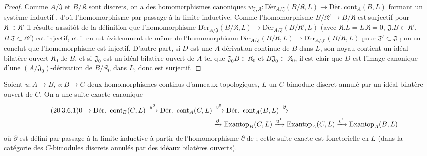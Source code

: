 \begin{proof}
Comme $A/\mathfrak{J}$ et $B/\mathfrak{K}$ sont discrets, on a des
homomorphismes canoniques
$w_{\mathfrak{J},\mathfrak{K}}:
\operatorname{D\acute{e}r}_{A/\mathfrak{J}}(B/\mathfrak{K},L)\to
\operatorname{D\acute{e}r.\ cont}_A(B,L)$ formant un système inductif
, d'où l'homomorphisme  par passage à
la limite inductive. Comme l'homomorphisme
$B/\mathfrak{K}'\to B/\mathfrak{K}$ est surjectif pour
$\mathfrak{K}\supset\mathfrak{K}'$ il résulte aussitôt de la définition que
l'homomorphisme
$\operatorname{D\acute{e}r}_{A/\mathfrak{J}}(B/\mathfrak{K},L)\to
\operatorname{D\acute{e}r}_{A/\mathfrak{J}}(B/\mathfrak{K}',L)$ (avec
$\mathfrak{K}.L=L.\mathfrak{K}=0$,
$\mathfrak{J}.B\subset\mathfrak{K}'$,
$B.\mathfrak{J}\subset\mathfrak{K}'$) est injectif, et il en est évidemment
de même de l'homomorphisme
$\operatorname{D\acute{e}r}_{A/\mathfrak{J}}(B/\mathfrak{K},L)\to
\operatorname{D\acute{e}r}_{A/\mathfrak{J}'}(B/\mathfrak{K},L)$ pour
$\mathfrak{J}'\subset\mathfrak{J}$  ; on en conclut que
l'homomorphisme  est injectif. D'autre part, si $D$ est
une $A$-dérivation continue de $B$ dans $L$, son noyau contient un idéal
bilatère ouvert $\mathfrak{K}_0$ de $B$, et si $\mathfrak{J}_0$ est un idéal
bilatère ouvert de $A$ tel que $\mathfrak{J}_0B\subset\mathfrak{K}_0$ et
$B\mathfrak{J}_0\subset\mathfrak{K}_0$, il est clair que $D$ est l'image
canonique d'une $(A/\mathfrak{J}_0)$-dérivation de
$B/\mathfrak{K}_0$ dans $L$, donc  est surjectif.
\end{proof}

\begin{proposition}[20.3.6]
\label{0.20.3.6-fr}
Soient $u:A\to B$, $v:B\to C$ deux homomorphismes continus d'anneaux
topologiques, $L$ un $C$-bimodule discret annulé par un idéal bilatère ouvert
de $C$. On a une suite exacte canonique
\begin{align}
\tag{20.3.6.1}
\label{0.20.3.6.1-fr}
  0\to\operatorname{D\acute{e}r.\ cont}_B(C,L)\xrightarrow{u^0}
  \operatorname{D\acute{e}r.\ cont}_A(C,L)&\xrightarrow{v^0}
  \operatorname{D\acute{e}r.\ cont}_A(B,L)\xrightarrow{\partial} \\
  &\xrightarrow{\partial}\operatorname{Exantop}_B(C,L)\xrightarrow{u^1}
  \operatorname{Exantop}_A(C,L)\xrightarrow{v^1}
  \operatorname{Exantop}_A(B,L) \notag
\end{align}
où $\partial$ est défini par passage à la limite inductive à partir de
l'homomorphisme $\partial$ de  ; cette suite exacte est
fonctorielle en $L$ (dans la catégorie des $C$-bimodules discrets annulés par
des idéaux bilatères ouverts).
\end{proposition}

